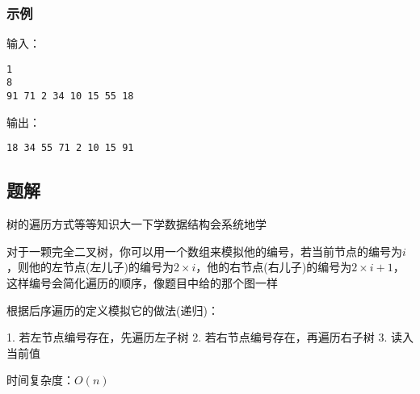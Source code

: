 \subsubsection{示例}
输入：
\begin{lstlisting}
1
8  
91 71 2 34 10 15 55 18
\end{lstlisting}

输出：
\begin{lstlisting}
18 34 55 71 2 10 15 91
\end{lstlisting}

\subsection{题解}
树的遍历方式等等知识大一下学数据结构会系统地学

对于一颗完全二叉树，你可以用一个数组来模拟他的编号，若当前节点的编号为$i$，则他的左节点(左儿子)的编号为$2 \times i$，他的右节点(右儿子)的编号为$2 \times i + 1$，这样编号会简化遍历的顺序，像题目中给的那个图一样

根据后序遍历的定义模拟它的做法(递归)：

1. 若左节点编号存在，先遍历左子树
2. 若右节点编号存在，再遍历右子树
3. 读入当前值

时间复杂度：$O(n)$
